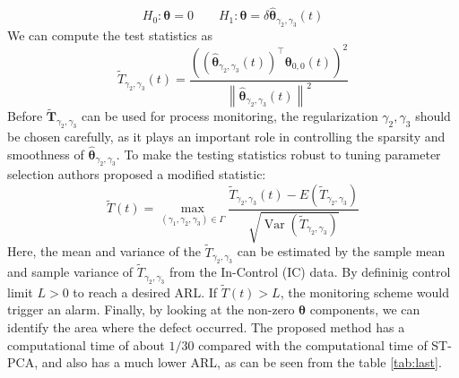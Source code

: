 \begin{equation}
H_0: \boldsymbol{\theta}=0 \qquad H_1: \boldsymbol{\theta}=\delta \hat{\boldsymbol{\theta}}_{\gamma_2, \gamma_3}(t)
\end{equation}
We can compute the test statistics as 
\begin{equation}
\tilde{T}_{\gamma_2, \gamma_3}(t)=\frac{\left(\left(\hat{\boldsymbol{\theta}}_{\gamma_2, \gamma_3}(t)\right)^{\top} \boldsymbol{\theta}_{0,0}(t)\right)^2}{\left\|\hat{\boldsymbol{\theta}}_{\gamma_2, \gamma_3}(t)\right\|^2} 
\end{equation}
Before $\tilde{\boldsymbol{T}}_{\gamma_2, \gamma_3}$ can be used for process monitoring, the regularization $\gamma_2, \gamma_3$ should be chosen carefully, as it plays an important role in controlling the sparsity and smoothness of $\hat{\boldsymbol{\theta}}_{\gamma_2, \gamma_3}$. To make the testing statistics robust to tuning parameter selection authors proposed a modified statistic:
\begin{equation}
\tilde{T}(t)=\max _{\left(\gamma_1, \gamma_2, \gamma_3\right) \in \Gamma} \frac{\tilde{T}_{\gamma_2, \gamma_3}(t)-E\left(\tilde{T}_{\gamma_2, \gamma_3}\right)}{\sqrt{\operatorname{Var}\left(\tilde{T}_{\gamma_2, \gamma_3}\right)}}
\end{equation}
Here, the mean and variance of the $\tilde{T}_{\gamma_2, \gamma_3}$ can be estimated by the sample mean and sample variance of $\tilde{T}_{\gamma_2, \gamma_3}$ from the In-Control (IC) data. By defininig control limit $L>0$ to reach a desired ARL. If $\tilde{T}(t)>L$, the monitoring scheme would trigger an alarm. Finally, by looking at the non-zero $\boldsymbol{\theta}$ components, we can identify the area where the defect occurred. The proposed method has a computational time of about $1/30$ compared with the computational time of ST-PCA, and also has a much lower ARL, as can be seen from the table \ref{tab:last}.
